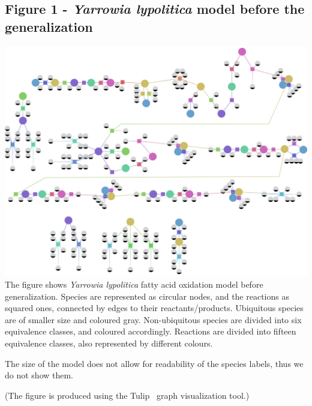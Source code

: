 \documentclass[10pt]{bmc_article}
\newenvironment{bmcformat}{\baselineskip20pt\sloppy\setboolean{publ}{false}}{\baselineskip20pt\sloppy}
\begin{document}
\begin{bmcformat}
\subsection*{Figure 1 - \textit{Yarrowia lypolitica} model before the generalization}
\includegraphics[scale=0.23]{pics/pero_before_colored.png} 
      The figure shows \textit{Yarrowia lypolitica} fatty acid oxidation model before generalization. Species are represented as circular nodes, and the reactions as squared ones, connected by edges to their reactants/products. Ubiquitous species are of smaller size and coloured gray. Non-ubiquitous species are divided into six equivalence classes, and coloured accordingly. Reactions are divided into fifteen equivalence classes, also represented by different colours.
      
      The size of the model does not allow for readability of the species labels, thus we do not show them.
      
      (The figure is produced using the Tulip~\cite{Auber04} graph visualization tool.)
\label{fig:bf}


\end{bmcformat}
\end{document}
